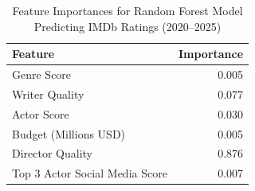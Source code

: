 \begin{table}
\caption{Feature Importances for Random Forest Model Predicting IMDb Ratings (2020--2025)}
\label{tab:rf_feature_importances}
\begin{tabular}{lr}
\toprule
Feature & Importance \\
\midrule
Genre Score & 0.005 \\
Writer Quality & 0.077 \\
Actor Score & 0.030 \\
Budget (Millions USD) & 0.005 \\
Director Quality & 0.876 \\
Top 3 Actor Social Media Score & 0.007 \\
\bottomrule
\end{tabular}
\end{table}
